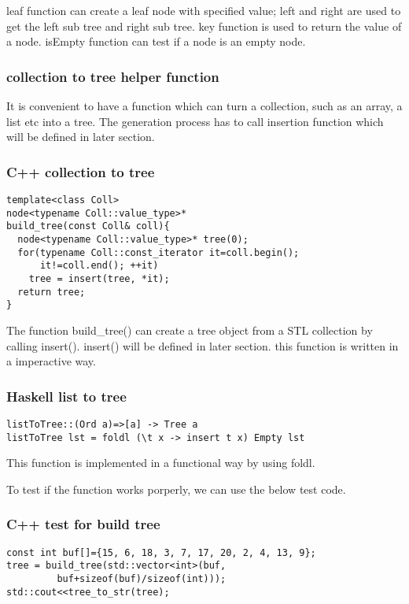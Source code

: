 \documentclass{article}
\begin{document}
leaf function can create a leaf node with specified value; left and right
are used to get the left sub tree and right sub tree. key function is
used to return the value of a node. isEmpty function can test if a node
is an empty node.

\subsubsection{collection to tree helper function}
It is convenient to have a function which can turn a collection, such as
an array, a list etc into a tree. The generation process has to call insertion
function which will be defined in later section.

\subsubsection*{C++ collection to tree}
\lstset{language=C++}
\begin{lstlisting}
template<class Coll>
node<typename Coll::value_type>* 
build_tree(const Coll& coll){
  node<typename Coll::value_type>* tree(0);
  for(typename Coll::const_iterator it=coll.begin(); 
      it!=coll.end(); ++it)
    tree = insert(tree, *it);
  return tree;
}
\end{lstlisting}

The function build\_tree() can create a tree object from a STL collection 
by calling insert(). insert() will be defined in later section. this function
is written in a imperactive way.

\subsubsection*{Haskell list to tree}
\lstset{language=Haskell}
\begin{lstlisting}
listToTree::(Ord a)=>[a] -> Tree a
listToTree lst = foldl (\t x -> insert t x) Empty lst
\end{lstlisting}

This function is implemented in a functional way by using foldl.

To test if the function works porperly, we can use the below test code.
\subsubsection*{C++ test for build tree}
\lstset{language=C++}
\begin{lstlisting}
const int buf[]={15, 6, 18, 3, 7, 17, 20, 2, 4, 13, 9};
tree = build_tree(std::vector<int>(buf, 
         buf+sizeof(buf)/sizeof(int)));
std::cout<<tree_to_str(tree);
\end{lstlisting}
\end{document}
